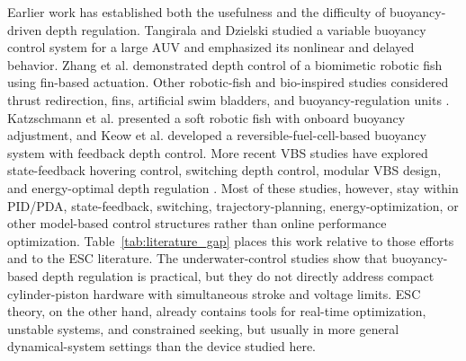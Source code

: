﻿\documentclass[subscriptcorrection,upint,varvw,barcolor=Goldenrod3,mathalfa=cal=euler,balance,hyphenate,french,pdf-a]{asmejour}
\begin{document}
Earlier work has established both the usefulness and the difficulty of buoyancy-driven depth regulation. Tangirala and Dzielski \cite{tangirala2007vbs} studied a variable buoyancy control system for a large AUV and emphasized its nonlinear and delayed behavior. Zhang et al. \cite{zhang2007fish} demonstrated depth control of a biomimetic robotic fish using fin-based actuation. Other robotic-fish and bio-inspired studies considered thrust redirection, fins, artificial swim bladders, and buoyancy-regulation units \cite{islam2021anguilliform,le2011bladder}. Katzschmann et al. \cite{katzschmann2018sofi} presented a soft robotic fish with onboard buoyancy adjustment, and Keow et al. \cite{keow2022fuelcell} developed a reversible-fuel-cell-based buoyancy system with feedback depth control. More recent VBS studies have explored state-feedback hovering control, switching depth control, modular VBS design, and energy-optimal depth regulation \cite{tiwari2020vbs,xia2024vbs,cao2023energy}. Most of these studies, however, stay within PID/PDA, state-feedback, switching, trajectory-planning, energy-optimization, or other model-based control structures rather than online performance optimization.
Table~\ref{tab:literature_gap} places this work relative to those efforts and to the ESC literature. The underwater-control studies show that buoyancy-based depth regulation is practical, but they do not directly address compact cylinder-piston hardware with simultaneous stroke and voltage limits. ESC theory, on the other hand, already contains tools for real-time optimization, unstable systems, and constrained seeking, but usually in more general dynamical-system settings than the device studied here.
\end{document}
